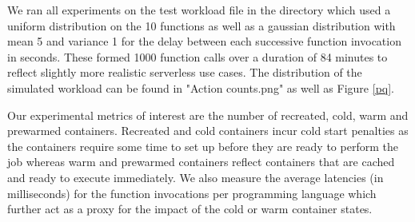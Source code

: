 \documentclass{article}
\begin{document}
We ran all experiments on the test workload file in the directory which used a uniform distribution on the 10 functions as well as a gaussian distribution with mean 5 and variance 1 for the delay between each successive function invocation in seconds. These formed 1000 function calls over a duration of 84 minutes to reflect slightly more realistic serverless use cases. The distribution of the simulated workload can be found in "Action counts.png" as well as Figure \ref{pq}.

Our experimental metrics of interest are the number of recreated, cold, warm and prewarmed containers. Recreated and cold containers incur cold start penalties as the containers require some time to set up before they are ready to perform the job whereas warm and prewarmed containers reflect containers that are cached and ready to execute immediately. We also measure the average latencies (in milliseconds) for the function invocations per programming language which further act as a proxy for the impact of the cold or warm container states.
\end{document}
